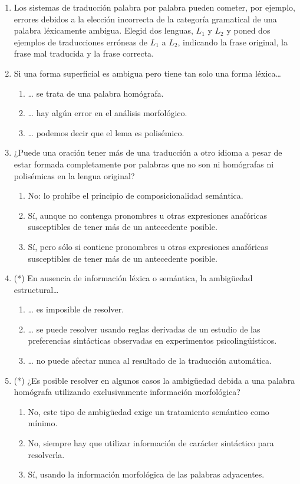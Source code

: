 \begin{enumerate}
\item Los sistemas de traducción palabra por palabra pueden cometer, por ejemplo, errores debidos a la elección incorrecta de la categoría gramatical de una palabra léxicamente ambigua. Elegid dos lenguas, $L_1$ y $L_2$ y poned dos ejemplos de traducciones erróneas de $L_1$ a $L_2$, indicando la frase original, la frase mal traducida y la frase correcta. 

\item Si una forma superficial es ambigua pero tiene tan solo una forma léxica{\ldots} \begin{enumerate} \item {\ldots} se trata de una palabra homógrafa. \item {\ldots} hay algún error en el análisis morfológico. \item {\ldots} podemos decir que el lema es polisémico. \end{enumerate} 

\item ¿Puede una oración tener más de una traducción a otro idioma a pesar de estar formada completamente por palabras que no son ni homógrafas ni polisémicas en la lengua original? \begin{enumerate} \item No: lo prohíbe el principio de composicionalidad semántica. \item Sí, aunque no contenga pronombres u otras expresiones anafóricas susceptibles de tener más de un antecedente posible. \item Sí, pero sólo si contiene pronombres u otras expresiones anafóricas susceptibles de tener más de un antecedente posible. \end{enumerate} 

\item (*) En ausencia de información léxica o semántica, la ambigüedad estructural{\ldots} \begin{enumerate} \item {\ldots} es imposible de resolver. \item {\ldots} se puede resolver usando reglas derivadas de un estudio de las preferencias sintácticas observadas en experimentos psicolingüísticos. \item {\ldots} no puede afectar nunca al resultado de la traducción automática. \end{enumerate} 

\item (*) ¿Es posible resolver en algunos casos la ambigüedad debida a una palabra homógrafa utilizando exclusivamente información morfológica? \begin{enumerate} \item No, este tipo de ambigüedad exige un tratamiento semántico como mínimo. \item No, siempre hay que utilizar información de carácter sintáctico para resolverla. \item Sí, usando la información morfológica de las palabras adyacentes. \end{enumerate} 


\end{enumerate}
